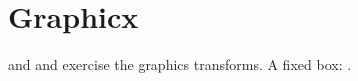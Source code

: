 \documentclass{article}
\begin{document}
\section{Graphicx}
 and  and
 exercise the graphics transforms.
A fixed box: .
\end{document}
